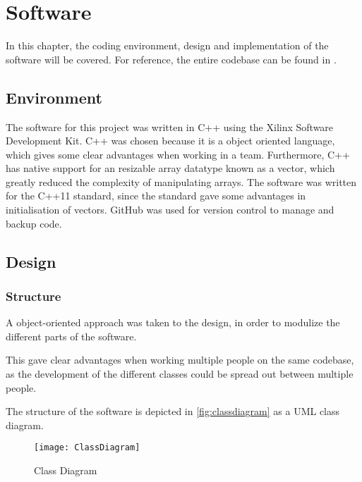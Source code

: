 \documentclass[Main]{subfiles}
\begin{document}
\section{Software} %
\label{sec:software}

	In this chapter, the coding environment, design and implementation of the software will be covered.
	For reference, the entire codebase can be found in .
	
	\subsection{Environment} %
	\label{sub:software_environment}

		The software for this project was written in C++ using the Xilinx Software Development Kit.
		C++ was chosen because it is a object oriented language, which gives some clear advantages when working in a team.
		Furthermore, C++ has native support for an resizable array datatype known as a vector, which greatly reduced the complexity of manipulating arrays.
		The software was written for the C++11 standard, since the standard gave some advantages in initialisation of vectors.
		GitHub was used for version control	to manage and backup code.
		
	\subsection{Design} %
	\label{sub:software_design}

	\subsubsection{Structure} %
	\label{subsub:software_structure}
		A object-oriented approach was taken to the design, in order to modulize the different parts of the software. 
		
		This gave clear advantages when working multiple people on the same codebase, as the development of the different classes could be spread out between multiple people.
		
		The structure of the software is depicted in \autoref{fig:classdiagram} as a UML class diagram.
		
		\begin{figure}[H]
			\centering
			\texttt{[image: ClassDiagram]}
			\caption{Class Diagram}
			\label{fig:classdiagram}
		\end{figure}
		
\end{document}
